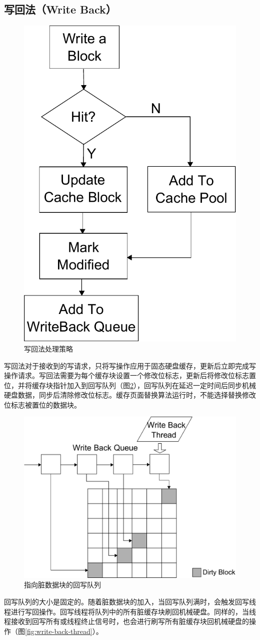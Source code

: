 \subsection{写回法（Write Back）}
\begin{figure}[!htb]
\centering
\includegraphics[width=0.4\linewidth]{./graph/write-back}
\caption{写回法处理策略}
\label{fig:write-back}
\end{figure}

写回法\cite{writeback2008}对于接收到的写请求，只将写操作应用于固态硬盘缓存，更新后立即完成写操作请求。写回法需要为每个缓存块设置一个修改位标志，更新后将修改位标志置位，并将缓存块指针加入到回写队列（图\ref{fig:write-back-queue}），回写队列在延迟一定时间后同步机械硬盘数据，同步后清除修改位标志。缓存页面替换算法运行时，不能选择替换修改位标志被置位的数据块。

\begin{figure}[H]
\centering
\includegraphics[width=0.6\linewidth]{./graph/write-back-queue}
\caption{指向脏数据块的回写队列}
\label{fig:write-back-queue}
\end{figure}

回写队列的大小是固定的。随着脏数据块的加入，当回写队列满时，会触发回写线程进行写回操作。回写线程将队列中的所有脏缓存块刷回机械硬盘。同样的，当线程接收到回写所有或线程终止信号时，也会进行刷写所有脏缓存块回机械硬盘的操作（图\ref{fig:write-back-thread}）。

